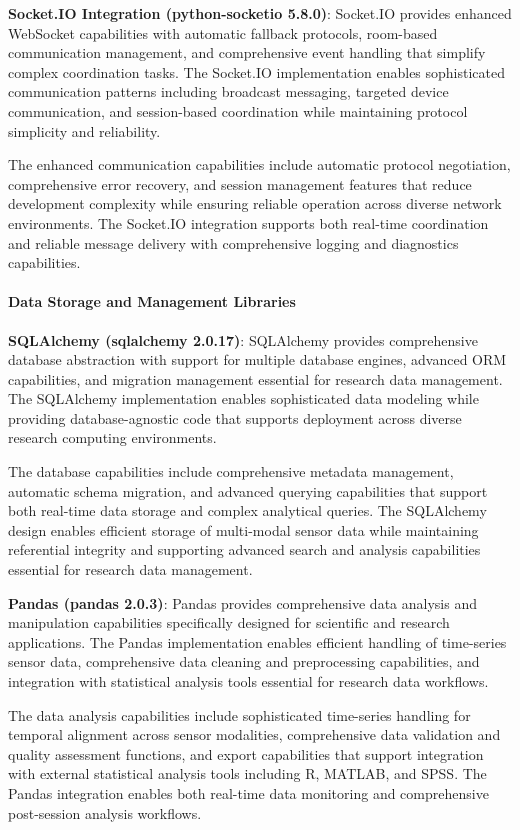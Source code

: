\documentclass[12pt,a4paper]{article}
\begin{document}
\textbf{Socket.IO Integration (python-socketio 5.8.0)}: Socket.IO provides enhanced WebSocket capabilities with automatic
fallback protocols, room-based communication management, and comprehensive event handling that simplify complex
coordination tasks. The Socket.IO implementation enables sophisticated communication patterns including broadcast
messaging, targeted device communication, and session-based coordination while maintaining protocol simplicity and
reliability.

The enhanced communication capabilities include automatic protocol negotiation, comprehensive error recovery, and
session management features that reduce development complexity while ensuring reliable operation across diverse network
environments. The Socket.IO integration supports both real-time coordination and reliable message delivery with
comprehensive logging and diagnostics capabilities.

\paragraph{Data Storage and Management Libraries}

\textbf{SQLAlchemy (sqlalchemy 2.0.17)}: SQLAlchemy provides comprehensive database abstraction with support for multiple
database engines, advanced ORM capabilities, and migration management essential for research data management. The
SQLAlchemy implementation enables sophisticated data modeling while providing database-agnostic code that supports
deployment across diverse research computing environments.

The database capabilities include comprehensive metadata management, automatic schema migration, and advanced querying
capabilities that support both real-time data storage and complex analytical queries. The SQLAlchemy design enables
efficient storage of multi-modal sensor data while maintaining referential integrity and supporting advanced search and
analysis capabilities essential for research data management.

\textbf{Pandas (pandas 2.0.3)}: Pandas provides comprehensive data analysis and manipulation capabilities specifically
designed for scientific and research applications. The Pandas implementation enables efficient handling of time-series
sensor data, comprehensive data cleaning and preprocessing capabilities, and integration with statistical analysis tools
essential for research data workflows.

The data analysis capabilities include sophisticated time-series handling for temporal alignment across sensor
modalities, comprehensive data validation and quality assessment functions, and export capabilities that support
integration with external statistical analysis tools including R, MATLAB, and SPSS. The Pandas integration enables both
real-time data monitoring and comprehensive post-session analysis workflows.
\end{document}
